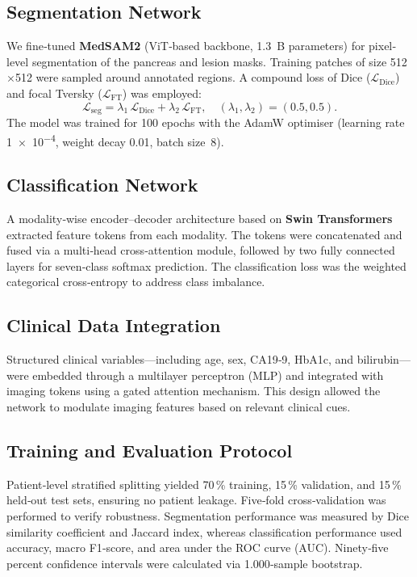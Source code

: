 \documentclass[a4paper, fleqn]{cas-dc}
\begin{document}
    \subsection{Segmentation Network}
    We fine‐tuned \textbf{MedSAM2} (ViT‐based backbone, 1.3~B parameters) for
    pixel‐level segmentation of the pancreas and lesion masks. Training patches of
    size \num{512}$\times$\num{512} were sampled around annotated regions. A
    compound loss of Dice ($\mathcal{L}_{\mathrm{Dice}}$) and focal Tversky ($\mathcal{L}
    _{\mathrm{FT}}$) was employed:
    \[
        \mathcal{L}_{\mathrm{seg}}= \lambda_{1}\,\mathcal{L}_{\mathrm{Dice}}+ \lambda
        _{2}\,\mathcal{L}_{\mathrm{FT}}, \quad (\lambda_{1},\lambda_{2})=(0.5,0.5
        ).
    \]
    The model was trained for \num{100} epochs with the AdamW optimiser (learning
    rate \SI{1e-4}{}, weight decay 0.01, batch size~8).

    \subsection{Classification Network}
    A modality‐wise encoder–decoder architecture based on \textbf{Swin
    Transformers} extracted feature tokens from each modality. The tokens were
    concatenated and fused via a multi‐head cross‐attention module, followed by two
    fully connected layers for seven‐class softmax prediction. The
    classification loss was the weighted categorical cross‐entropy to address
    class imbalance.

    \subsection{Clinical Data Integration}
    Structured clinical variables—including age, sex, CA19‑9, HbA1c, and
    bilirubin—were embedded through a multilayer perceptron (MLP) and integrated
    with imaging tokens using a gated attention mechanism. This design allowed the
    network to modulate imaging features based on relevant clinical cues.

    \subsection{Training and Evaluation Protocol}
    Patient‐level stratified splitting yielded 70\,\% training, 15\,\%
    validation, and 15\,\% held‐out test sets, ensuring no patient leakage. Five‐fold
    cross‐validation was performed to verify robustness. Segmentation
    performance was measured by Dice similarity coefficient and Jaccard index, whereas
    classification performance used accuracy, macro F1‐score, and area under the
    ROC curve (AUC). Ninety‐five percent confidence intervals were calculated
    via \num{1,000}‐sample bootstrap.
\end{document}
